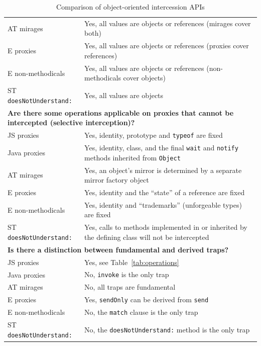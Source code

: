 \documentclass{acm_proc_article-sp}
\begin{document}
\begin{table}
\begin{tabular}{|p{}|p{}|}
    AT mirages        & Yes, all values are objects or references (mirages cover both)\\
    E proxies         & Yes, all values are objects or references (proxies cover references)\\
    E non-methodicals & Yes, all values are objects or references (non-methodicals cover objects)\\
    ST \texttt{doesNotUnderstand:}  & Yes, all values are objects\\
    \hline
    \multicolumn{2}{|l|}{\textbf{Are there some operations applicable on proxies that cannot be intercepted (selective interception)?}}\\
    \hline
    JS proxies        & Yes, identity, prototype and \texttt{typeof} are fixed\\
    Java proxies      & Yes, identity, class, and the final \texttt{wait} and \texttt{notify} methods inherited from \texttt{Object}\\
    AT mirages        & Yes, an object's mirror is determined by a separate mirror factory object\\
    E proxies         & Yes, identity and the ``state'' of a reference are fixed\\
    E non-methodicals & Yes, identity and ``trademarks'' (unforgeable types) are fixed\\
    ST \texttt{doesNotUnderstand:}  & Yes, calls to methods implemented in or inherited by the defining class will not be intercepted\\
    \hline
    \multicolumn{2}{|l|}{\textbf{Is there a distinction between fundamental and derived traps?}}\\
    \hline
    JS proxies        & Yes, see Table~\ref{tab:operations}\\
    Java proxies      & No, \texttt{invoke} is the only trap\\
    AT mirages        & No, all traps are fundamental\\
    E proxies         & Yes, \texttt{sendOnly} can be derived from \texttt{send}\\
    E non-methodicals & No, the \texttt{match} clause is the only trap\\
    ST \texttt{doesNotUnderstand:}  & No, the \texttt{doesNotUnderstand:} method is the only trap\\
    \hline
  \end{tabular}
  \caption{Comparison of object-oriented intercession APIs}
  \label{tab:related_work}
\end{table}
\end{document}
